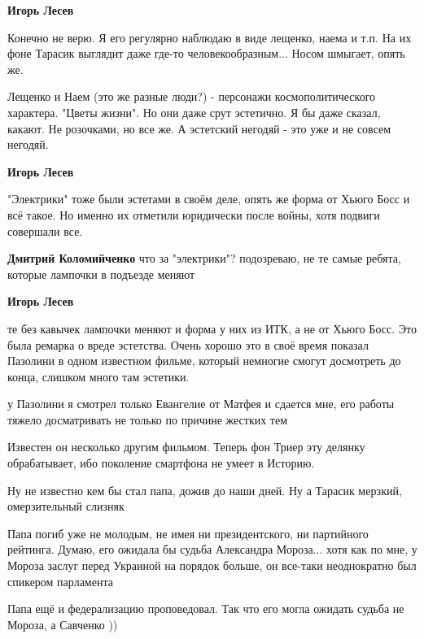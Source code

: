 \begin{itemize}
\begin{itemize}
\textbf{Игорь Лесев} 

Конечно не верю. Я его регулярно наблюдаю в виде лещенко, наема и т.п. На их
фоне Тарасик выглядит даже где-то человекообразным... Носом шмыгает, опять же.



Лещенко и Наем (это же разные люди?) - персонажи космополитического характера.
"Цветы жизни". Но они даже срут эстетично. Я бы даже сказал, какают. Не
розочками, но все же. А эстетский негодяй - это уже и не совсем негодяй.

\textbf{Игорь Лесев} 

"Электрики" тоже были эстетами в своём деле, опять же форма от Хьюго Босс и всё
такое. Но именно их отметили юридически после войны, хотя подвиги совершали
все.

\textbf{Дмитрий Коломийченко} что за "электрики"? подозреваю, не те самые ребята, которые лампочки в подъезде меняют

\textbf{Игорь Лесев} 

те без кавычек лампочки меняют и форма у них из ИТК, а не от Хьюго Босс. Это
была ремарка о вреде эстетства. Очень хорошо это в своё время показал Пазолини
в одном известном фильме, который немногие смогут досмотреть до конца, слишком
много там эстетики.

у Пазолини я смотрел только Евангелие от Матфея и сдается мне, его работы тяжело досматривать не только по причине жестких тем

Известен он несколько другим фильмом. Теперь фон Триер эту делянку обрабатывает, ибо поколение смартфона не умеет в Историю.
\end{itemize} %

Ну не известно кем бы стал папа, дожив до наши дней. Ну а Тарасик мерзкий, омерзительный слизняк

\begin{itemize} %

Папа погиб уже не молодым, не имея ни президентского, ни партийного рейтинга.
Думаю, его ожидала бы судьба Александра Мороза... хотя как по мне, у Мороза
заслуг перед Украиной на порядок больше, он все-таки неоднократно был спикером
парламента

Папа ещё и федерализацию проповедовал. Так что его могла ожидать судьба не Мороза, а Савченко ))


\end{itemize}
\end{itemize}
